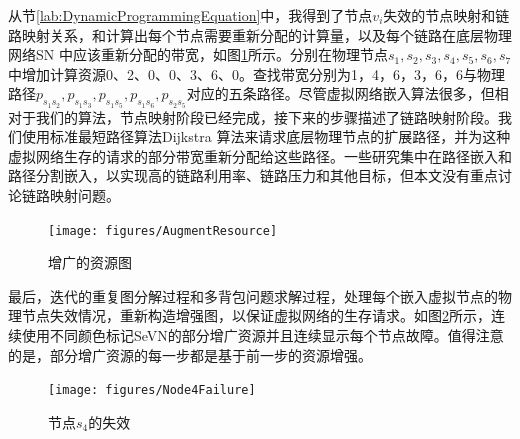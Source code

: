 从节\ref{lab:DynamicProgrammingEquation}中，我得到了节点$v_i$失效的节点映射和链路映射关系，和计算出每个节点需要重新分配的计算量，以及每个链路在底层物理网络SN 中应该重新分配的带宽，如图\ref{fig:AugmentResource}所示。分别在物理节点$s_1,s_2,s_3,s_4,s_5,s_6,s_7$中增加计算资源0、2、0、0、3、6、0。查找带宽分别为1，4，6，3，6，6与物理路径$p_{s_1s_2},p_{s_1s_3},p_{s_1s_5},p_{s_1s_6},p_{s_2s_5}$对应的五条路径。尽管虚拟网络嵌入算法很多，但相对于我们的算法，节点映射阶段已经完成，接下来的步骤描述了链路映射阶段。我们使用标准最短路径算法Dijkstra 算法\cite{skiena1990dijkstra}来请求底层物理节点的扩展路径，并为这种虚拟网络生存的请求的部分带宽重新分配给这些路径。一些研究\cite{yu2008rethinking}集中在路径嵌入和路径分割嵌入，以实现高的链路利用率、链路压力和其他目标，但本文没有重点讨论链路映射问题。
\begin{figure}[htb]
  \centering
  \texttt{[image: figures/AugmentResource]}\\
  \caption{增广的资源图}\label{fig:AugmentResource}
\end{figure}
最后，迭代的重复图分解过程和多背包问题求解过程，处理每个嵌入虚拟节点的物理节点失效情况，重新构造增强图，以保证虚拟网络的生存请求。如图\ref{fig:Node4Failure}所示，连续使用不同颜色标记SeVN的部分增广资源并且连续显示每个节点故障。值得注意的是，部分增广资源的每一步都是基于前一步的资源增强。
\begin{figure}[htb]
\centering
\texttt{[image: figures/Node4Failure]}\\
  \caption{节点$s_4$的失效}\label{fig:Node4Failure}
\end{figure}
